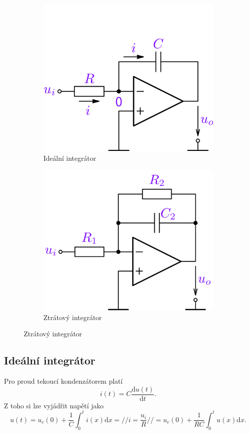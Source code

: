\documentclass[a4paper,12pt]{article}   %
\begin{document}
\begin{figure}[h!]
    \centering
    \begin{subfigure}{.49\textwidth}
        \centering
        \includegraphics[height=.5\linewidth]{integrator-ideal.PNG}
        \caption{Ideální integrátor}
        \label{sch:integrator:ideal}
    \end{subfigure}
    \begin{subfigure}{.49\textwidth}
        \centering
        \includegraphics[height=.5\linewidth]{integrator-real.PNG}
        \caption{Ztrátový integrátor}
        \label{sch:integrator:ztatovy}
    \end{subfigure}
\end{figure}

\subsection*{Ideální integrátor}
Pro proud tekoucí kondenzátorem platí
\begin{equation*}
    i(t) = C\frac{\text{d}u(t)}{\text{d}t}.
\end{equation*}
Z toho si lze vyjádřit napětí jako
\begin{equation*}
    u(t) = u_c(0) + \frac{1}{C}\int_0^t i(x)\text{d}x =//i=\frac{u_i}{R}//= u_c(0) + \frac{1}{RC}\int_0^t u(x)\text{d}x.
\end{equation*}
\end{document}
